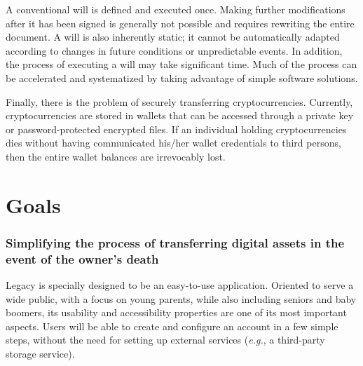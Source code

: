 A conventional will is defined and executed once. Making further modifications after it has been signed is generally not possible and requires rewriting the entire document. A will is also inherently static; it cannot be automatically adapted according to changes in future conditions or unpredictable events. In addition, the process of executing a will may take significant time. Much of the process can be accelerated and systematized by taking advantage of simple software solutions. 

Finally, there is the problem of securely transferring cryptocurrencies. Currently, cryptocurrencies are stored in wallets that can be accessed through a private key or password-protected encrypted files. If an individual holding cryptocurrencies dies without having communicated his/her wallet credentials to third persons, then the entire wallet balances are irrevocably lost. 


\section{Goals} %
\label{sec:goals}

\subsubsection*{Simplifying the process of transferring digital assets in the event of the owner's death} %
\label{ssub:simplifying_the_process_of_transferring_your_digital_possessions_after_your_death}
Legacy is specially designed to be an easy-to-use application. 
Oriented to serve a wide public, with a focus on young parents, while also including seniors and baby boomers, its usability and accessibility properties are one of its most important aspects.
Users will be able to create and configure an account in a few simple steps, without the need for setting up external services (\textit{e.g.}, a third-party storage service). 


